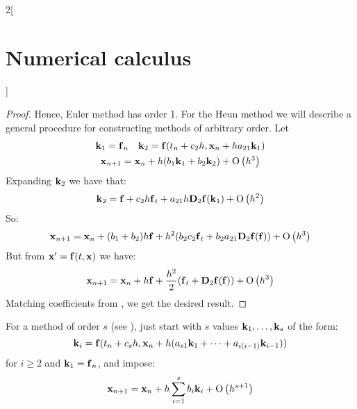 \documentclass[../../../main_math.tex]{subfiles}
\begin{document}
\begin{multicols}{2}[\section{Numerical calculus}]
\begin{proof}
    Hence, Euler method has order 1. For the Heun method we will describe a general procedure for constructing methods of arbitrary order. Let
    \begin{gather*}
      \vf{k}_1=\vf{f}_n\quad \vf{k}_2=\vf{f}(t_n+c_2h,\vf{x}_n+ha_{21}\vf{k}_1)\\
      \vf{x}_{n+1}=\vf{x}_n+h(b_1\vf{k}_1+b_2\vf{k}_2)+\O{h^3}
    \end{gather*}
    Expanding $\vf{k}_2$ we have that:
    $$\vf{k}_2=\vf{f}+c_2h\vf{{f}}_t+a_{21}h\vf{D}_2\vf{f}(\vf{k}_1)+\O{h^2}$$
    So:
    \begin{equation}\label{NC:heun1}
      \vf{x}_{n+1}=\vf{x}_n+(b_1+b_2)h\vf{f}+h^2(b_2c_2\vf{{f}}_t+b_2a_{21}\vf{D}_2\vf{f}(\vf{f}))+\O{h^3}
    \end{equation}
    But from $\vf{x}'=\vf{f}(t,\vf{x})$ we have:
    \begin{equation}\label{NC:heun2}
      \vf{x}_{n+1}=\vf{x}_n+h\vf{f}+\frac{h^2}{2}(\vf{{f}}_t+\vf{D}_2\vf{f}(\vf{f}))+\O{h^3}
    \end{equation}
    Matching coefficients from , we get the desired result.
  \end{proof}
  \begin{remark}
    For a method of order $s$ (see ), just start with $s$ values $\vf{k}_1,\ldots,\vf{k}_s$ of the form: $$\vf{k}_i=\vf{f}(t_n+c_sh,\vf{x}_n+h(a_{s1}\vf{k}_1+\cdots+a_{i(i-1)}\vf{k}_{i-1}))$$
    for $i\geq 2$ and $\vf{k}_1=\vf{f}_n$, and impose:
    $$\vf{x}_{n+1}=\vf{x}_n+h\sum_{i=1}^s b_i\vf{k}_i+\O{h^{s+1}}$$
  \end{remark}

\end{multicols}
\end{document}
